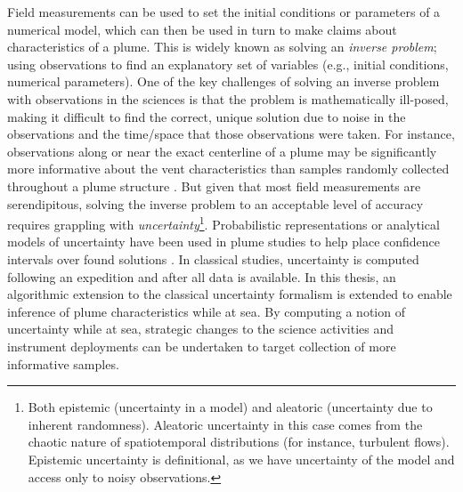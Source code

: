 Field measurements can be used to set the initial conditions or parameters of a numerical model, which can then be used in turn to make claims about characteristics of a plume.
This is widely known as solving an \emph{inverse problem}; using observations to find an explanatory set of variables (e.g., initial conditions, numerical parameters).
One of the key challenges of solving an inverse problem with observations in the sciences is that the problem is mathematically ill-posed, making it difficult to find the correct, unique solution due to noise in the observations and the time/space that those observations were taken.
For instance, observations along or near the exact centerline of a plume may be significantly more informative about the vent characteristics \autocite{bangian2022solution} than samples randomly collected throughout a plume structure \autocite{baker1998rise}.
But given that most field measurements are serendipitous, solving the inverse problem to an acceptable level of accuracy requires grappling with \emph{uncertainty}\footnote{Both epistemic (uncertainty in a model) and aleatoric (uncertainty due to inherent randomness). Aleatoric uncertainty in this case comes from the chaotic nature of spatiotemporal distributions (for instance, turbulent flows). Epistemic uncertainty is definitional, as we have uncertainty of the model and access only to noisy observations.}.
Probabilistic representations or analytical models of uncertainty have been used in plume studies to help place confidence intervals over found solutions \autocite{bemis1993geothermal,sohn2019observations}.
In classical studies, uncertainty is computed following an expedition and after all data is available.
In this thesis, an algorithmic extension to the classical uncertainty formalism is extended to enable inference of plume characteristics while at sea.
By computing a notion of uncertainty while at sea, strategic changes to the science activities and instrument deployments can be undertaken to target collection of more informative samples.



